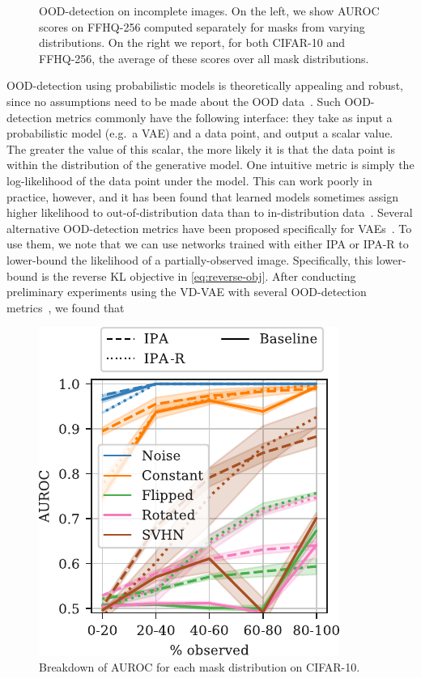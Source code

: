 \begin{figure}[t]
\begin{minipage}{.58\textwidth}
\end{minipage}%
\caption{OOD-detection on incomplete images. On the left, we show AUROC scores
  on FFHQ-256 computed separately for masks from varying distributions. On the
  right we report, for both CIFAR-10 and FFHQ-256, the average of these scores
  over all mask distributions.}
\label{fig:cigcvae-ood-results}
\end{figure}

OOD-detection using probabilistic models is theoretically appealing and robust,
since no assumptions need to be made about the OOD
data~\citep{xiao2020likelihood,havtorn2021hierarchical}. Such OOD-detection
metrics commonly have the following interface: they take as input a
probabilistic model (e.g.~a VAE) and a data point, and output a scalar value.
The greater the value of this scalar, the more likely it is that the data point
is within the distribution of the generative model. One intuitive metric is
simply the log-likelihood of the data point under the model. This can work
poorly in practice, however, and it has been found that learned models sometimes
assign higher likelihood to out-of-distribution data than to in-distribution
data~\citep{nalisnick2018deep}. Several alternative OOD-detection metrics have
been proposed specifically for
VAEs~\citep{xiao2020likelihood,havtorn2021hierarchical}. To use them, we note
that we can use networks trained with either IPA or IPA-R to lower-bound the
likelihood of a partially-observed image. Specifically, this lower-bound is the
reverse KL objective in \cref{eq:reverse-obj}. After conducting preliminary
experiments using the VD-VAE with several OOD-detection
metrics~\citep{xiao2020likelihood,havtorn2021hierarchical}, we found that
\begin{figure}
  \vspace{-.4cm}
  \centering
  \includegraphics[scale=.8]{figs/cigcvae/ood-supplementary}
  \caption{Breakdown of AUROC for each mask distribution on CIFAR-10. }
  \label{fig:cigcvae-ood-supplementary}
\end{figure}
